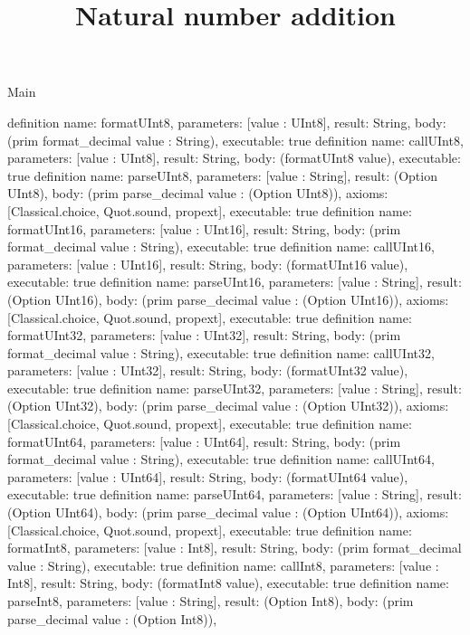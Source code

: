 \begin{lexlean}{Main}
\title{Natural number addition}
\begin{semanticmodule}
definition{
  name: formatUInt8,
  parameters: [value : UInt8],
  result: String,
  body: (prim format_decimal value : String),
  executable: true
}
definition{
  name: callUInt8,
  parameters: [value : UInt8],
  result: String,
  body: (formatUInt8 value),
  executable: true
}
definition{
  name: parseUInt8,
  parameters: [value : String],
  result: (Option UInt8),
  body: (prim parse_decimal value : (Option UInt8)),
  axioms: [Classical.choice, Quot.sound, propext],
  executable: true
}
definition{
  name: formatUInt16,
  parameters: [value : UInt16],
  result: String,
  body: (prim format_decimal value : String),
  executable: true
}
definition{
  name: callUInt16,
  parameters: [value : UInt16],
  result: String,
  body: (formatUInt16 value),
  executable: true
}
definition{
  name: parseUInt16,
  parameters: [value : String],
  result: (Option UInt16),
  body: (prim parse_decimal value : (Option UInt16)),
  axioms: [Classical.choice, Quot.sound, propext],
  executable: true
}
definition{
  name: formatUInt32,
  parameters: [value : UInt32],
  result: String,
  body: (prim format_decimal value : String),
  executable: true
}
definition{
  name: callUInt32,
  parameters: [value : UInt32],
  result: String,
  body: (formatUInt32 value),
  executable: true
}
definition{
  name: parseUInt32,
  parameters: [value : String],
  result: (Option UInt32),
  body: (prim parse_decimal value : (Option UInt32)),
  axioms: [Classical.choice, Quot.sound, propext],
  executable: true
}
definition{
  name: formatUInt64,
  parameters: [value : UInt64],
  result: String,
  body: (prim format_decimal value : String),
  executable: true
}
definition{
  name: callUInt64,
  parameters: [value : UInt64],
  result: String,
  body: (formatUInt64 value),
  executable: true
}
definition{
  name: parseUInt64,
  parameters: [value : String],
  result: (Option UInt64),
  body: (prim parse_decimal value : (Option UInt64)),
  axioms: [Classical.choice, Quot.sound, propext],
  executable: true
}
definition{
  name: formatInt8,
  parameters: [value : Int8],
  result: String,
  body: (prim format_decimal value : String),
  executable: true
}
definition{
  name: callInt8,
  parameters: [value : Int8],
  result: String,
  body: (formatInt8 value),
  executable: true
}
definition{
  name: parseInt8,
  parameters: [value : String],
  result: (Option Int8),
  body: (prim parse_decimal value : (Option Int8)),
}
\end{semanticmodule}
\end{lexlean}
